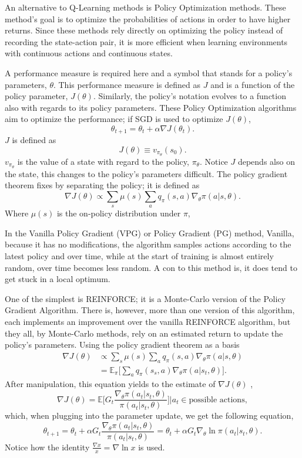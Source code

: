 An alternative to Q-Learning methods is Policy Optimization methods. These method's goal is to optimize the probabilities of actions in order to have higher returns. Since these methods rely directly on optimizing the policy instead of recording the state-action pair, it is more efficient when learning environments with continuous actions and continuous states.

A  performance measure is required here and a symbol that stands for a policy's parameters, $\theta$. This performance measure is defined as $J$ and is a function of the policy parameter, $J(\theta)$. Similarly, the policy's notation evolves to a function also with regards to its policy parameters. These Policy Optimization algorithms aim to optimize the performance; if SGD is used to optimize $J(\theta)$, $$\theta_{t+1}=\theta_t+\alpha \nabla J(\theta_t).$$ $J$ is defined as $$J(\theta)\equiv v_{\pi_{\theta}}(s_0).$$ $v_{\pi_{\theta}}$ is the value of a state with regard to the policy, $\pi_{\theta}$. Notice $J$ depends also on the state, this changes to the policy's parameters difficult. The policy gradient theorem fixes by separating the policy; it is defined as $$\nabla J(\theta)\propto \sum_s \mu(s) \sum_a q_\pi (s, a)\nabla_{\theta} \pi (a|s, \theta).$$ Where $\mu(s)$ is the on-policy distribution under $\pi$, 

In the Vanilla Policy Gradient (VPG) or Policy Gradient (PG) method, Vanilla, because it has no modifications, the algorithm samples actions according to the latest policy and over time, while at the start of training is almost entirely random, over time becomes less random. A con to this method is, it does tend to get stuck in a local optimum.

One of the simplest is REINFORCE; it is a Monte-Carlo version of the Policy Gradient Algorithm. There is, however, more than one version of this algorithm, each implements an improvement over the vanilla REINFORCE algorithm, but they all, by Monte-Carlo methods, rely on an estimated return to update the policy's parameters. Using the policy gradient theorem as a basis
\begin{align*}
	\nabla J(\theta)&\propto \sum_s \mu(s) \sum_a q_\pi (s, a)\nabla_{\theta} \pi (a|s, \theta) \\
	&=\mathbb{E}_\pi \bigg[\sum_a q_\pi(s_s, a)\nabla_\theta \pi(a|s_t, \theta)\bigg].
\end{align*} After manipulation, this equation yields to the estimate of $\nabla J(\theta)$ ,$$\nabla J(\theta)=\mathbb{E}\bigg[G_t \frac{\nabla_\theta \pi(a_t|s_t, \theta)}{\pi(a_t|s_t, \theta)}\bigg]\bigg|a_t\in \text{possible actions},$$ which, when plugging into the parameter update, we get the following equation, $$\theta_{t+1}=\theta_t+\alpha G_t\frac{\nabla_\theta \pi(a_t|s_t, \theta)}{\pi(a_t|s_t, \theta)}=\theta_t + \alpha G_t \nabla_\theta \ln \pi(a_t|s_t, \theta).$$ Notice how the identity $\frac{\nabla x}{x}=\nabla \ln x$ is used.

